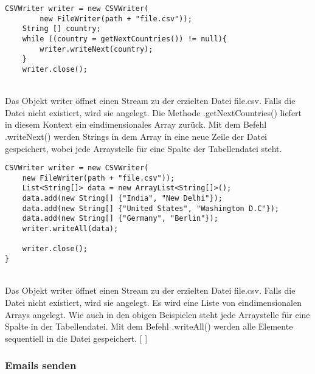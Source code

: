 \documentclass[FIPLY_base.tex]{subfiles}
\begin{document}
\begin{lstlisting}[caption={Verwendung von CSVWriter: Möglichkeit 1, iterativ},label=DescriptiveLabel]
	CSVWriter writer = new CSVWriter(
		new FileWriter(path + "file.csv"));
	String [] country;
	while ((country = getNextCountries()) != null){
		writer.writeNext(country);
	}
	writer.close();
\end{lstlisting}
\ \\
Das Objekt \grqq{}writer\grqq{} öffnet einen Stream zu der erzielten Datei \grqq{}file.csv\grqq{}. Falls die Datei nicht existiert, wird sie angelegt.
Die Methode .getNextCountries() liefert in diesem Kontext ein eindimensionales Array zurück. Mit dem Befehl .writeNext() werden Strings in dem Array in eine neue Zeile der Datei gespeichert, wobei jede Arraystelle für eine Spalte der Tabellendatei steht.
\ \\
\begin{lstlisting}[caption={Verwendung von CSVWriter: Möglichkeit 2, alles auf einmal},label=DescriptiveLabel]
	CSVWriter writer = new CSVWriter(
	new FileWriter(path + "file.csv"));
    List<String[]> data = new ArrayList<String[]>();
    data.add(new String[] {"India", "New Delhi"});
    data.add(new String[] {"United States", "Washington D.C"});
    data.add(new String[] {"Germany", "Berlin"});
    writer.writeAll(data);

    writer.close();
}
\end{lstlisting}
\ \\
Das Objekt \grqq{}writer\grqq{} öffnet einen Stream zu der erzielten Datei \grqq{}file.csv\grqq{}. Falls die Datei nicht existiert, wird sie angelegt.
Es wird eine Liste von eindimensionalen Arrays angelegt. Wie auch in den obigen Beispielen steht jede Arraystelle für eine Spalte in der Tabellendatei. Mit dem Befehl .writeAll() werden alle Elemente sequentiell in die Datei gespeichert.
[ \cite{exportCSVSourceWrite}] 
\ \\
\subsubsection{Emails senden}
\end{document}
